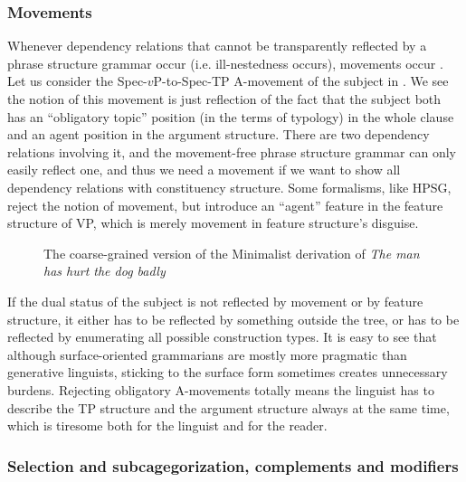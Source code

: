\documentclass[../main.tex]{subfiles}
\begin{document}
\subsubsection{Movements}\label{sec:movement-in-theory}

Whenever dependency relations that cannot be transparently reflected by a phrase structure grammar occur
(i.e. ill-nestedness occurs), movements occur \cite{boston2009dependency}. 
Let us consider the Spec-$v$P-to-Spec-TP A-movement of the subject in . We see the notion of this movement is just reflection of the fact 
that the subject both has an ``obligatory topic'' position (in the terms of typology) in the whole clause 
and an agent position in the argument structure. There are two dependency relations involving it, and 
the movement-free phrase structure grammar can only easily reflect one, and thus we need a movement 
if we want to show all dependency relations with constituency structure. Some formalisms, like HPSG,
reject the notion of movement, but introduce an ``agent'' feature in the feature structure of 
VP, which is merely movement in feature structure's disguise. 

\begin{figure}
    \centering
    
    \caption{The coarse-grained version of the Minimalist derivation of \emph{The man has hurt the dog badly}}
    \label{fig:coarse-grained-hurt-the-dog-badly}
\end{figure}

If the dual status of the subject is not reflected by movement or by feature structure, 
it either has to be reflected by something outside the tree, 
or has to be reflected by enumerating all possible construction types. 
It is easy to see that although surface-oriented grammarians are mostly more pragmatic than generative linguists, 
sticking to the surface form sometimes creates unnecessary burdens. 
Rejecting obligatory A-movements totally means the linguist has to 
describe the TP structure and the argument structure always at the same time, 
which is tiresome both for the linguist and for the reader. 

\subsubsection{Selection and subcagegorization, complements and modifiers}\label{sec:sub-cat}
\end{document}
